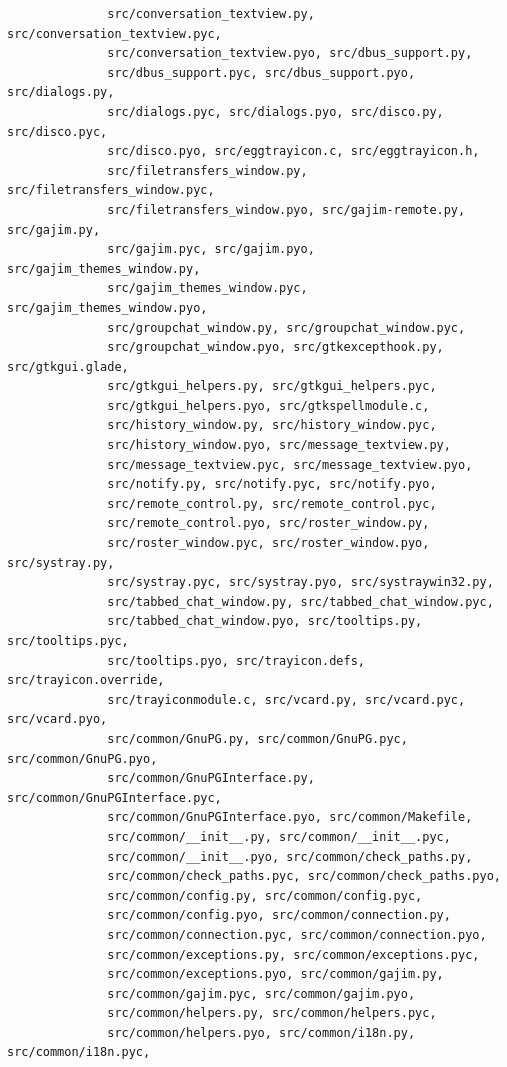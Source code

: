 \documentclass[a4paper]{article}
\begin{document}
\begin{verbatim}
              src/conversation_textview.py, src/conversation_textview.pyc,
              src/conversation_textview.pyo, src/dbus_support.py,
              src/dbus_support.pyc, src/dbus_support.pyo, src/dialogs.py,
              src/dialogs.pyc, src/dialogs.pyo, src/disco.py, src/disco.pyc,
              src/disco.pyo, src/eggtrayicon.c, src/eggtrayicon.h,
              src/filetransfers_window.py, src/filetransfers_window.pyc,
              src/filetransfers_window.pyo, src/gajim-remote.py, src/gajim.py,
              src/gajim.pyc, src/gajim.pyo, src/gajim_themes_window.py,
              src/gajim_themes_window.pyc, src/gajim_themes_window.pyo,
              src/groupchat_window.py, src/groupchat_window.pyc,
              src/groupchat_window.pyo, src/gtkexcepthook.py, src/gtkgui.glade,
              src/gtkgui_helpers.py, src/gtkgui_helpers.pyc,
              src/gtkgui_helpers.pyo, src/gtkspellmodule.c,
              src/history_window.py, src/history_window.pyc,
              src/history_window.pyo, src/message_textview.py,
              src/message_textview.pyc, src/message_textview.pyo,
              src/notify.py, src/notify.pyc, src/notify.pyo,
              src/remote_control.py, src/remote_control.pyc,
              src/remote_control.pyo, src/roster_window.py,
              src/roster_window.pyc, src/roster_window.pyo, src/systray.py,
              src/systray.pyc, src/systray.pyo, src/systraywin32.py,
              src/tabbed_chat_window.py, src/tabbed_chat_window.pyc,
              src/tabbed_chat_window.pyo, src/tooltips.py, src/tooltips.pyc,
              src/tooltips.pyo, src/trayicon.defs, src/trayicon.override,
              src/trayiconmodule.c, src/vcard.py, src/vcard.pyc, src/vcard.pyo,
              src/common/GnuPG.py, src/common/GnuPG.pyc, src/common/GnuPG.pyo,
              src/common/GnuPGInterface.py, src/common/GnuPGInterface.pyc,
              src/common/GnuPGInterface.pyo, src/common/Makefile,
              src/common/__init__.py, src/common/__init__.pyc,
              src/common/__init__.pyo, src/common/check_paths.py,
              src/common/check_paths.pyc, src/common/check_paths.pyo,
              src/common/config.py, src/common/config.pyc,
              src/common/config.pyo, src/common/connection.py,
              src/common/connection.pyc, src/common/connection.pyo,
              src/common/exceptions.py, src/common/exceptions.pyc,
              src/common/exceptions.pyo, src/common/gajim.py,
              src/common/gajim.pyc, src/common/gajim.pyo,
              src/common/helpers.py, src/common/helpers.pyc,
              src/common/helpers.pyo, src/common/i18n.py, src/common/i18n.pyc,

\end{verbatim}
\end{document}
